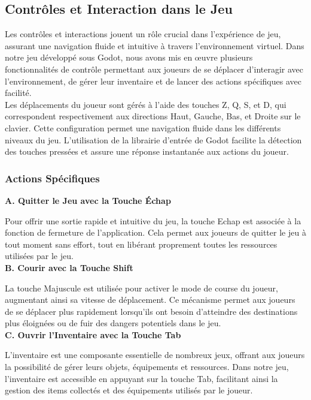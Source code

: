 \subsection{Contrôles et Interaction dans le Jeu}

Les contrôles et interactions jouent un rôle crucial dans l'expérience de jeu, assurant une navigation fluide et intuitive à travers l'environnement virtuel.
Dans notre jeu développé sous Godot, nous avons mis en œuvre plusieurs fonctionnalités de contrôle permettant aux joueurs de se déplacer d'interagir avec l'environnement, de gérer leur inventaire et de lancer des actions spécifiques avec facilité.
\\

Les déplacements du joueur sont gérés à l'aide des touches Z, Q, S, et D, qui correspondent respectivement aux directions Haut, Gauche, Bas, et Droite sur le clavier.
Cette configuration permet une navigation fluide dans les différents niveaux du jeu.
L'utilisation de la librairie d'entrée de Godot facilite la détection des touches pressées et assure une réponse instantanée aux actions du joueur.

\subsubsection{Actions Spécifiques}

\textbf{A. Quitter le Jeu avec la Touche Échap}
\vspace*{0.2cm}

Pour offrir une sortie rapide et intuitive du jeu, la touche Echap est associée à la fonction de fermeture de l'application.
Cela permet aux joueurs de quitter le jeu à tout moment sans effort, tout en libérant proprement toutes les ressources utilisées par le jeu.
\\

\textbf{B. Courir avec la Touche Shift}
\vspace*{0.2cm}

La touche Majuscule est utilisée pour activer le mode de course du joueur, augmentant ainsi sa vitesse de déplacement.
Ce mécanisme permet aux joueurs de se déplacer plus rapidement lorsqu'ils ont besoin d'atteindre des destinations plus éloignées ou de fuir des dangers potentiels dans le jeu.
\\

\textbf{C. Ouvrir l'Inventaire avec la Touche Tab}
\vspace*{0.2cm}

L'inventaire est une composante essentielle de nombreux jeux, offrant aux joueurs la possibilité de gérer leurs objets, équipements et ressources.
Dans notre jeu, l'inventaire est accessible en appuyant sur la touche Tab, facilitant ainsi la gestion des items collectés et des équipements utilisés par le joueur.
\\

